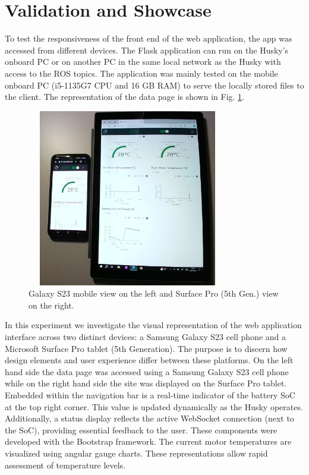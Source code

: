 \documentclass[conference]{IEEEtran}
\begin{document}
\section{Validation and Showcase}\label{VS}
To test the responsiveness of the front end of the web application, the app was accessed from different devices. The Flask application can run on the Husky's onboard PC or on another PC in the same local network as the Husky with access to the ROS topics. The application was mainly tested on the mobile onboard PC (i5-1135G7 CPU and 16 GB RAM) to serve the locally stored files to the client.
The representation of the data page is shown in Fig. \ref{fig:galaxysurface}. 
\begin{figure}[htbp]
    \centerline{\includegraphics[width=8.8cm, height=7.75cm]{Pictures/galaxysurfacecut.png}}
    \caption{Galaxy S23 mobile view on the left and Surface Pro (5th Gen.) view on the right.}
    \label{fig:galaxysurface}
\end{figure}
In this experiment we investigate the visual representation of the web application interface across two distinct devices: a Samsung Galaxy S23 cell phone and a Microsoft Surface Pro tablet (5th Generation). The purpose is to discern how design elements and user experience differ between these platforms.
On the left hand side the data page was accessed using a Samsung Galaxy S23 cell phone while on the right hand side the site was displayed on the Surface Pro tablet.
Embedded within the navigation bar is a real-time indicator of the battery SoC at the top right corner. This value is updated dynamically as the Husky operates.
Additionally, a status display reflects the active WebSocket connection (next to the SoC), providing essential feedback to the user.
These components were developed with the Bootstrap framework. The current motor temperatures are visualized using angular gauge charts. These representations allow rapid assessment of temperature levels.
\end{document}
